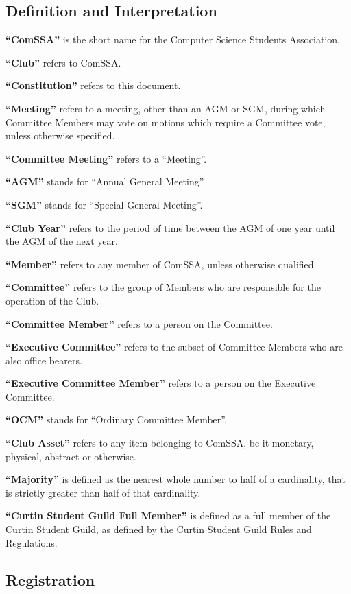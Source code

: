 \documentclass[a4paper,12pt]{article}
\begin{document}
\subsection{Definition and Interpretation}

\textbf{``ComSSA''} is the short name for the Computer Science Students Association.

\textbf{``Club''} refers to ComSSA.

\textbf{``Constitution''} refers to this document.

\textbf{``Meeting''} refers to a meeting, other than an AGM or SGM, during which Committee Members may vote on motions which require a Committee vote, unless otherwise specified.

\textbf{``Committee Meeting''} refers to a ``Meeting''.

\textbf{``AGM''} stands for ``Annual General Meeting''.

\textbf{``SGM''} stands for ``Special General Meeting''.

\textbf{``Club Year''} refers to the period of time between the AGM of one year until the AGM of the next year.

\textbf{``Member''} refers to any member of ComSSA, unless otherwise qualified.

\textbf{``Committee''} refers to the group of Members who are responsible for the operation of the Club.

\textbf{``Committee Member''} refers to a person on the Committee.

\textbf{``Executive Committee''} refers to the subset of Committee Members who are also office bearers.

\textbf{``Executive Committee Member''} refers to a person on the Executive Committee.

\textbf{``OCM''} stands for ``Ordinary Committee Member''.

\textbf{``Club Asset''} refers to any item belonging to ComSSA, be it monetary, physical, abstract or otherwise.

\textbf{``Majority''} is defined as the nearest whole number to half of a cardinality, that is strictly greater than half of that cardinality.

\textbf{``Curtin Student Guild Full Member''} is defined as a full member of the Curtin Student Guild, as defined by the Curtin Student Guild Rules and Regulations.

\subsection{Registration}
\end{document}
